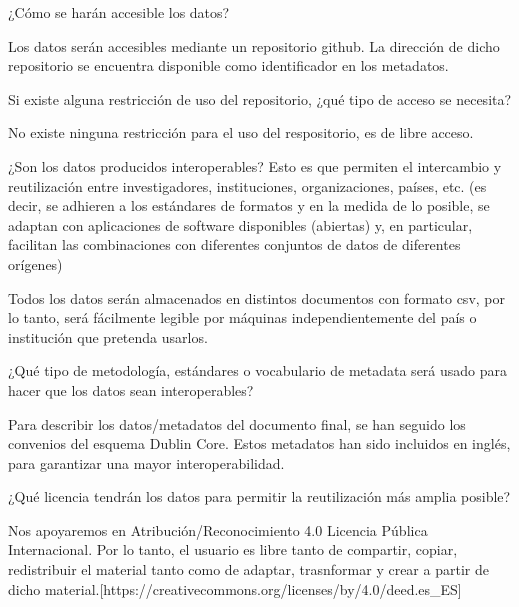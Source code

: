 \documentclass[12pt, spanish]{article}
\begin{document}
\begin{shaded}
¿Cómo se harán accesible los datos?
\end{shaded}
Los datos serán accesibles mediante un repositorio github. La dirección de dicho repositorio se encuentra disponible como identificador en los metadatos.\\

\begin{shaded}
Si existe alguna restricción de uso del repositorio, ¿qué tipo de acceso se necesita? 
\end{shaded}
No existe ninguna restricción para el uso del respositorio, es de libre acceso.\\


\begin{shaded}
¿Son los datos producidos interoperables? Esto es que permiten el intercambio y reutilización entre investigadores, instituciones, organizaciones, países, etc. (es decir, se adhieren a los estándares de formatos y en la medida de lo posible, se adaptan con aplicaciones de software disponibles (abiertas) y, en particular, facilitan las combinaciones con diferentes conjuntos de datos de diferentes orígenes)
\end{shaded}
Todos los datos serán almacenados en distintos documentos con formato csv, por lo tanto, será fácilmente legible por máquinas independientemente del país o institución que pretenda usarlos.\\


\begin{shaded}
¿Qué tipo de metodología, estándares o vocabulario de metadata será usado para hacer que los datos sean interoperables?
\end{shaded}
Para describir los datos/metadatos del documento final, se han seguido los convenios del esquema Dublin Core. Estos metadatos han sido incluidos en inglés, para garantizar una mayor interoperabilidad.\\



\begin{shaded}
¿Qué licencia tendrán los datos para permitir la reutilización más amplia posible?
\end{shaded}
Nos apoyaremos en Atribución/Reconocimiento 4.0 Licencia Pública Internacional. Por lo tanto, el usuario es libre tanto de compartir, copiar, redistribuir el material tanto como de adaptar, trasnformar y crear a partir de dicho material.[https://creativecommons.org/licenses/by/4.0/deed.es_ES]\\
\end{document}
